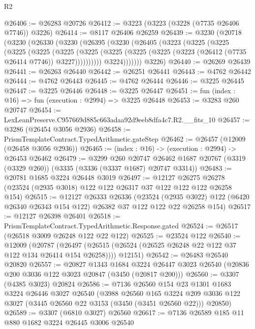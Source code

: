 \begin{lexlean}{R2}
\begin{coremodule}
@26406 := @26283 @20726
@26412 := @3223 (@3223 (@3228 (@7735 @26406 @7746)) @3226)
@26414 := @8117 @26406 @26259
@26439 := @3230
    (@20718
      (@3230
        (@26330
          (@3230
            (@26395
              (@3230
                (@26405
                  (@3223
                    (@3225
                      (@3225
                        (@3225
                          (@3225
                            (@3225
                              (@3225
                                (@3225
                                  (@3225 (@3225 (@3223 (@26412 (@7735 @26414 @7746)) @3227))))))))))
                    @3224)))))))
      @3226)
@26440 := @26269 @26439
@26441 := @26263 @26440
@26442 := @26251 @26441
@26443 := @4762 @26442
@26444 := @4762 @26443
@26445 := @4762 @26444
@26446 := @3225 @26445
@26447 := @3225 @26446
@26448 := @3225 @26447
@26451 := fun (index : @16) => fun (execution : @2994) => @3225 @26448
@26453 := @3283 @260 @20747
@26454 := LexLeanPreserve.C957669d885c663adaa92d9eeb8dfa4c7.R2.__fits_10
@26457 := @3286 (@26454 @3056 @2936)
@26458 := PrismTemplateContract.TypedArithmetic.gateStep
@26462 := @26457 (@12009 (@26458 @3056 @2936))
@26465 := (index : @16) -> (execution : @2994) -> @26453 @26462
@26479 := @3299
    @260
    @20747
    @26462
    @1687
    @20767
    (@3319 (@3329 @260))
    (@3335 (@3336 (@3337 @1687) @20747 @3314))
@26483 := @20781 @1685 @3224 @26448 @3019
@26497 := @12127
    @26275
    @26278
    (@23524 (@2935 @3018) @122 @122 @26317 @37 @122 @122 @122 @26258 @154)
@26515 := @12127
    @26333
    @26336
    (@23524 (@2935 @3022) @122 (@6420 @26340 @26343 @154 @122) @26382 @37 @122 @122 @22 @26258 @154)
@26517 := @12127 @26398 @26401
@26518 := PrismTemplateContract.TypedArithmetic.Response.gated
@26524 := @26517 (@26518 @3009 @26248 @122 @22 @122)
@26525 := @23524 @122
@26540 := @12009
    (@20787
      (@26497 (@26515 (@26524 (@26525 @26248 @22 @122 @37 @122 @134 @26414 @154 @26258))))
      @12151)
@26542 := @26483 @26540 @20820
@26557 := @20827
    @1343
    @1684
    @3224
    @26447
    @3023
    @26540
    (@20836 @200 @3036 @122 @3023 @20847 (@3450 (@20817 @200)))
@26560 := @3307 (@4385 @3023) @20824
@26586 := @7136
    @26560
    @154
    @23
    @1301
    @1683
    @3224
    @26446
    @3027
    @26540
    (@3988
      @26560
      @165
      @3224
      @209
      @3036
      @122
      @3027
      (@3445 @26560 @22 @3153 (@3450 (@3451 @26560 @22)))
      @20850)
@26589 := @3307 (@6810 @3027) @26560
@26617 := @7136
    @26589
    @185
    @11
    @880
    @1682
    @3224
    @26445
    @3006
    @26540

\end{coremodule}
\end{lexlean}
